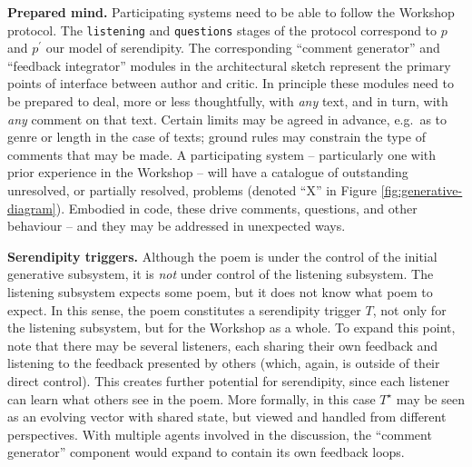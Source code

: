 
\noindent \textbf{Prepared mind.}
Participating systems need to be able to follow the Workshop protocol.
The {\tt listening} and {\tt questions} stages of the protocol
correspond to $p$ and $p^{\prime}$ our model of serendipity.  The
corresponding ``comment generator'' and ``feedback integrator''
modules in the architectural sketch represent the primary points of
interface between author and critic. 
In principle these modules need to be prepared to deal, more or less
thoughtfully, with \emph{any} text, and in turn, with \emph{any}
comment on that text.  Certain limits may be agreed in advance,
e.g.~as to genre or length in the case of texts; ground rules may
constrain the type of comments that may be made.
A participating system -- particularly one with prior experience in
the Workshop -- will have a catalogue of outstanding unresolved, or
partially resolved, problems (denoted ``X'' in Figure \ref{fig:generative-diagram}).
Embodied in code, these drive comments, questions, and other
behaviour -- and they may be addressed in unexpected ways.\par\medskip

\noindent \textbf{Serendipity triggers.}
Although the poem is under the control of the initial generative
subsystem, it is \emph{not} under control of the listening subsystem.
The listening subsystem expects some poem, but it does not know what
poem to expect.  In this sense, the poem constitutes a serendipity
trigger $T$, not only for the listening subsystem, but for the
Workshop as a whole.
%
To expand this point, note that there may be several listeners, each
sharing their own feedback and listening to the feedback presented by
others (which, again, is outside of their direct control).  This
creates further potential for serendipity, since each listener can
learn what others see in the poem.  More formally, in this case
$T^\star$ may be seen as an evolving vector with shared state, but viewed
and handled from different perspectives.  With multiple agents
involved in the discussion, the ``comment generator'' component would
expand to contain its own feedback loops.\par\medskip

